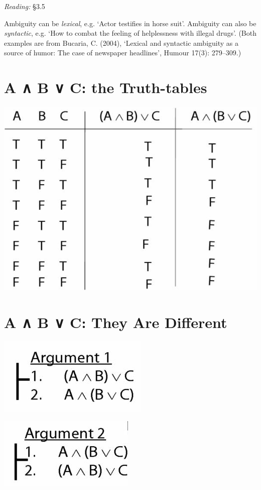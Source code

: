 \documentclass[12pt]{extarticle}
\begin{document}
\begin{multicols*}{3}
\emph{Reading:} §3.5
 
Ambiguity can be \emph{lexical}, e.g. `Actor testifies in horse suit'. Ambiguity can also be \emph{syntactic}, e.g. `How to combat the feeling of helplessness with illegal drugs'. (Both examples are from Bucaria, C. (2004), `Lexical and syntactic ambiguity as a source of humor: The case of newspaper headlines', Humour 17(3): 279--309.)
 
 
 
\section{A ∧ B ∨ C: the Truth-tables}
 
\begin{center}
\includegraphics[scale=0.3]{img/tt_unit_153.png}
\end{center}
 
 
\section{A ∧ B ∨ C: They Are Different}
 
\begin{center}
\includegraphics[scale=0.3]{img/arg1_unit_153.png}
\end{center}
\begin{center}
\includegraphics[scale=0.3]{img/arg2_unit_153.png}
\end{center}
 
 

 


\end{multicols*}
\end{document}
